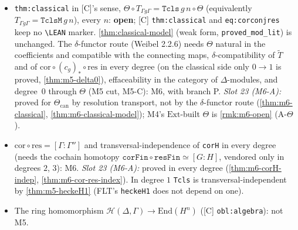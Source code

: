 \begin{remark}\label{rmk:m5-open}
  \begin{itemize}
    \item [C] \texttt{thm:classical} in [C]'s sense, $\Theta\circ T_{\Gamma g\Gamma}=\texttt{Tcls}\,g\,n\circ\Theta$ (equivalently
      $T_{\Gamma g\Gamma}=\texttt{TclsM}\,g\,n$), every $n$: \textbf{open}; [C] \texttt{thm:classical} and \texttt{eq:corconjres} keep no
      \texttt{\textbackslash LEAN} marker. \ref{thm:classical-model} (weak form, \texttt{proved\_mod\_lit}) is unchanged. The
      $\delta$-functor route (Weibel 2.2.6) needs $\Theta$ natural in the coefficients and compatible with the connecting maps,
      $\delta$-compatibility of $\widetilde T$ and of $\mathrm{cor}\circ(c_g)_*\circ\mathrm{res}$ in every degree (on the classical
      side only $0\to1$ is proved, \ref{thm:m5-delta0}), effaceability in the category of $\Delta$-modules, and degree~$0$ through
      $\Theta$ (M5 cut, M5-C): M6, with branch P. \emph{Slot 23 (M6-A):} proved for $\Theta_{\mathrm{can}}$ by resolution
      transport, not by the $\delta$-functor route (\ref{thm:m6-classical}, \ref{thm:m6-classical-model}); M4's $\mathrm{Ext}$-built
      $\Theta$ is \ref{rmk:m6-open} (A-$\Theta$).
    \item $\mathrm{cor}\circ\mathrm{res}=[\Gamma:\Gamma'']$ and transversal-independence of \texttt{corH} in every degree (needs the
      cochain homotopy $\texttt{corFin}\circ\texttt{resFin}\simeq[G:H]$, vendored only in degrees $2$, $3$): M6. \emph{Slot 23 (M6-A):}
      proved in every degree (\ref{thm:m6-corH-indep}, \ref{thm:m6-cor-res-index}). In degree $1$
      \texttt{Tcls} is transversal-independent by \ref{thm:m5-heckeH1} (FLT's \texttt{heckeH1} does not depend on one).
    \item The ring homomorphism $\mathcal H(\Delta,\Gamma)\to\mathrm{End}(H^n)$ ([C] \texttt{obl:algebra}): not M5.
  \end{itemize}
\end{remark}

